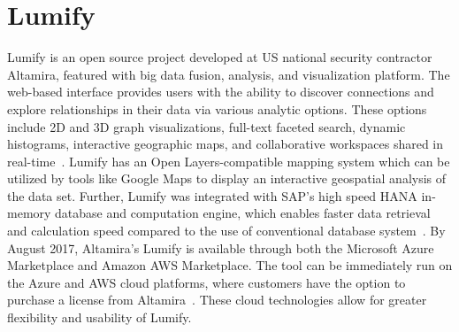 \section{Lumify}

Lumify is an open source project developed at US national security
contractor Altamira, featured with big data fusion, analysis, and
visualization platform. The web-based interface provides users with
the ability to discover connections and explore relationships in their
data via various analytic options. These options include 2D and 3D
graph visualizations, full-text faceted search, dynamic histograms,
interactive geographic maps, and collaborative workspaces shared in
real-time~\cite{hid-sp18-405-www-lumify}. Lumify has an Open
Layers-compatible mapping system which can be utilized by tools like
Google Maps to display an interactive geospatial analysis of the data
set. Further, Lumify was integrated with SAP's high speed HANA
in-memory database and computation engine, which enables faster data
retrieval and calculation speed compared to the use of conventional
database system~\cite{hid-sp18-405-linkedinblog-lumify}. By August
2017, Altamira’s Lumify is available through both the Microsoft Azure
Marketplace and Amazon AWS Marketplace. The tool can be immediately
run on the Azure and AWS cloud platforms, where customers have the
option to purchase a license from
Altamira~\cite{hid-sp18-405-wwwaws-lumify}\cite{hid-sp18-405-wwwazure-lumify}. These
cloud technologies allow for greater flexibility and usability of
Lumify.
